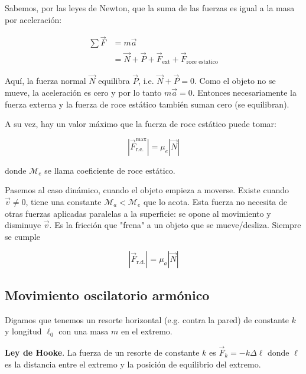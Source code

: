 \documentclass[12pt]{article}
\theoremstyle{definition}
\begin{document}
Sabemos, por las leyes de Newton, que la suma de las fuerzas es igual a la masa
por aceleración: 

\begin{align*}
    \sum \vec{F} &= m \vec{a}  \\ 
                 &= \vec{N} + \vec{P} + \vec{F}_{\text{ext}} +
                 \vec{F}_{\text{roce estatico}}
\end{align*}

Aquí, la fuerza normal $\vec{N}$ equilibra $\vec{P}$, i.e. $\vec{N} + \vec{P} =
0$. Como el objeto no se mueve, la aceleración es cero y por lo tanto $m\vec{a}
= 0$. Entonces necesariamente la fuerza externa y la fuerza de roce estático
también suman cero (se equilibran). 

A su vez, hay un valor máximo que la fuerza de roce estático puede tomar: 

\begin{equation*}
    \left| \vec{F}_{\text{r.e.}}^{\text{max}} \right| = \mu_e \left|
    \vec{N} \right| 
\end{equation*}

donde $\mathcal{M}_e$ se llama coeficiente de roce estático.

Pasemos al caso dinámico, cuando el objeto empieza a moverse. Existe cuando
$\vec{v} \neq 0$,  tiene una constante $\mathcal{M}_a < \mathcal{M}_e$ que lo
acota.  Esta fuerza no necesita de otras fuerzas aplicadas paralelas a la
superficie: se opone al movimiento y disminuye $\vec{v}$. Es la fricción que
"frena" a un objeto que se mueve/desliza. Siempre se cumple 

\begin{equation*}
    \left| \vec{F}_{\text{r.d.}} \right| = \mu_a \left| \vec{N} \right| 
\end{equation*} 

\subsection{Movimiento oscilatorio armónico}

Digamos que tenemos un resorte horizontal (e.g. contra la pared) de constante $k$ y longitud $\ell_0$ con una masa
$m$ en el extremo. 

\begin{shaded}
    \textbf{Ley de Hooke}. La fuerza de un resorte de constante $k$ es 
    $\vec{F}_k = -k \Delta \ell$ donde $\ell$ es la distancia entre el extremo 
    y la posición de equilibrio del extremo.
\end{shaded}
\end{document}
